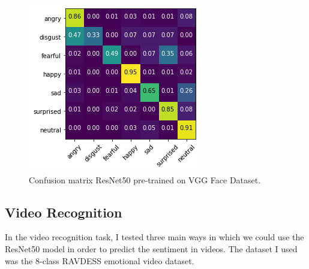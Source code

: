 \documentclass[sigconf]{acmart}
\begin{document}
{\begin{figure}
	\includegraphics[width=0.7\linewidth]{images/image-vgg.png}
	\caption{Confusion matrix ResNet50 pre-trained on VGG Face Dataset.}
  \label{fig:image-vgg}
\end{figure}





\subsection{Video Recognition}

In the video recognition task, I tested three main ways in which we could use
the ResNet50 model in order to predict the sentiment in videos. The dataset I
used was the 8-class RAVDESS emotional video dataset. 



}
\end{document}
